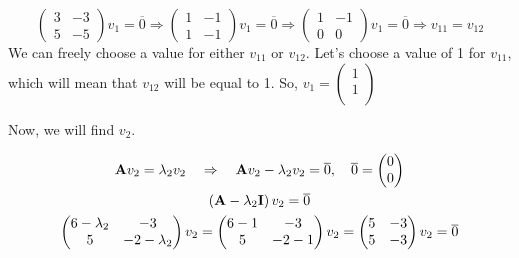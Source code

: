 \documentclass{homework}
\begin{document}
    \begin{equation*}
    \left(\begin{matrix}
        3 & -3 \\
        5  & -5
        \end{matrix}\right)v_1 = \overline{0} \Rightarrow
        \left(\begin{matrix}
        1 & -1 \\
        1  & -1
        \end{matrix}\right)v_1 = \overline{0} \Rightarrow
        \left(\begin{matrix}
        1 & -1 \\
        0  & 0
        \end{matrix}\right)v_1 = \overline{0} \Rightarrow
        v_{11} = v_{12}
    \end{equation*}
    We can freely choose a value for either $v_{11}$ or $v_{12}$. Let's choose a value of 1 for $v_{11}$, which will mean that $v_{12}$ will be equal to 1. So, $v_1 = \left(\begin{matrix}
    1 \\
    1 \\
    \end{matrix}\right)$
    
    Now, we will find $v_2$.
    
        \begin{equation*}
    \begin{gathered}
        \text{\textbf{A}}v_2 = \lambda_2 v_2 \quad \Rightarrow \quad \text{\textbf{A}}v_2 - \lambda_2 v_2 = \overline{0}, \quad \overline{0} = \left(\begin{matrix}
        0 \\
        0 \\
        \end{matrix}\right) \\
        \left(\text{\textbf{A}} - \lambda_2 \text{\textbf{I}}\right)v_2 = \overline{0} \\
        \left(\begin{matrix}
        6-\lambda_2 & -3 \\
        5  & -2-\lambda_2
        \end{matrix}\right)v_2 = 
        \left(\begin{matrix}
        6-1 & -3 \\
        5  & -2-1
        \end{matrix}\right)v_2 = 
        \left(\begin{matrix}
        5 & -3 \\
        5  & -3
        \end{matrix}\right)v_2 = \overline{0}
        \end{gathered}
    \end{equation*}
    
\end{document}
